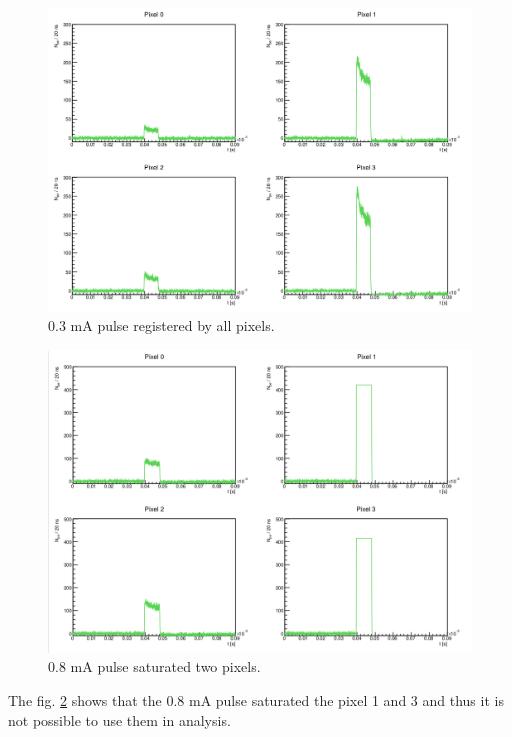 \begin{figure}[H]
 \centering
 \includegraphics[scale=0.35, angle = 0]{./pictures/CalibPulses.png}
 \caption{0.3 mA pulse registered by all pixels.}
 \label{03pulse}
 
\end{figure}

\begin{figure}[H]
 \centering
 \includegraphics[scale=0.35, angle = 0]{./pictures/CalibSaturated.png}
 \caption{0.8 mA pulse saturated two pixels.}
 \label{08pulse}
 
\end{figure}


The fig. \ref{08pulse} shows that the 0.8 mA pulse saturated the pixel 1 and 3 and thus it is not possible to use them in analysis. 


